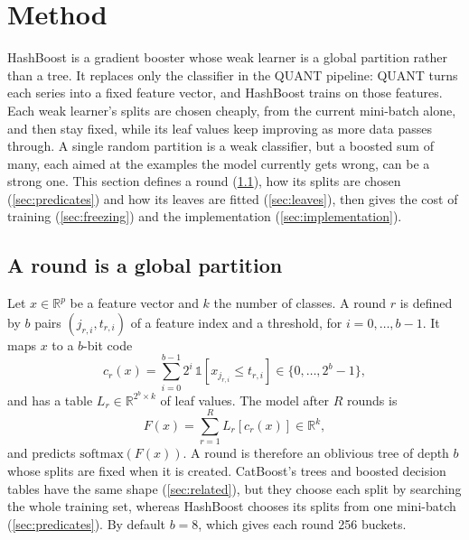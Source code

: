 \documentclass[a4paper, 11pt]{article}
\begin{document}
\section{Method}
\label{sec:method}

HashBoost is a gradient booster whose weak learner is a global partition
rather than a tree. It replaces only the classifier in the QUANT pipeline:
QUANT turns each series into a fixed feature vector, and HashBoost trains on
those features. Each weak learner's splits are chosen cheaply, from the
current mini-batch alone, and then stay fixed, while its leaf values keep
improving as more data passes through. A single random partition
is a weak classifier, but a boosted sum of many, each aimed at the examples
the model currently gets wrong, can be a strong one. This section defines a
round (\cref{sec:round}), how its splits are chosen (\cref{sec:predicates})
and how its leaves are fitted (\cref{sec:leaves}), then gives the cost of
training (\cref{sec:freezing}) and the implementation
(\cref{sec:implementation}).

\subsection{A round is a global partition}
\label{sec:round}

Let $x \in \mathbb{R}^p$ be a feature vector and $k$ the number of classes. A
round $r$ is defined by $b$ pairs $(j_{r,i}, t_{r,i})$ of a feature index and a
threshold, for $i = 0, \dots, b-1$. It maps $x$ to a $b$-bit code
\begin{equation}
    c_r(x) = \sum_{i=0}^{b-1} 2^i \, \mathbb{1}\!\left[x_{j_{r,i}} \le t_{r,i}\right]
    \in \{0, \dots, 2^b - 1\},
\end{equation}
and has a table $L_r \in \mathbb{R}^{2^b \times k}$ of leaf values. The model
after $R$ rounds is
\begin{equation}
    F(x) = \sum_{r=1}^{R} L_r\!\left[c_r(x)\right] \in \mathbb{R}^k,
\end{equation}
and predicts $\mathrm{softmax}(F(x))$. A round is therefore an oblivious tree
of depth $b$ whose splits are fixed when it is created. CatBoost's trees and
boosted decision tables have the same shape (\cref{sec:related}), but they
choose each split by searching the whole training set, whereas HashBoost
chooses its splits from one mini-batch (\cref{sec:predicates}). By default
$b = 8$, which gives each round 256 buckets.
\end{document}
